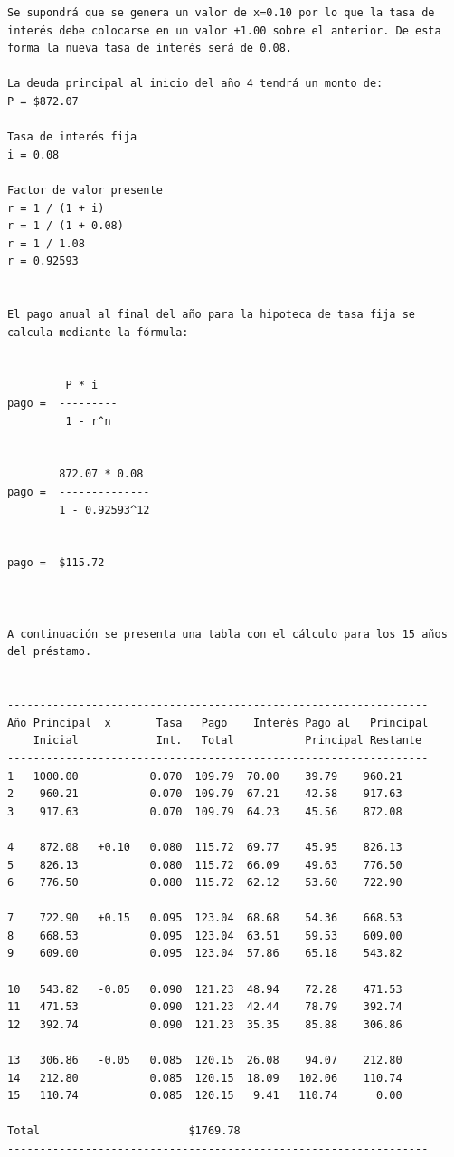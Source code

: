 \begin{verbatim}
Se supondrá que se genera un valor de x=0.10 por lo que la tasa de interés debe colocarse en un valor +1.00 sobre el anterior. De esta forma la nueva tasa de interés será de 0.08.

La deuda principal al inicio del año 4 tendrá un monto de:
P = $872.07

Tasa de interés fija         
i = 0.08

Factor de valor presente
r = 1 / (1 + i)
r = 1 / (1 + 0.08)
r = 1 / 1.08
r = 0.92593


El pago anual al final del año para la hipoteca de tasa fija se calcula mediante la fórmula:


         P * i
pago =  ---------
         1 - r^n


        872.07 * 0.08
pago =  --------------
        1 - 0.92593^12


pago =  $115.72



A continuación se presenta una tabla con el cálculo para los 15 años del préstamo.


-----------------------------------------------------------------
Año Principal  x       Tasa   Pago    Interés Pago al   Principal
    Inicial            Int.   Total           Principal Restante
-----------------------------------------------------------------
1   1000.00           0.070  109.79  70.00    39.79    960.21
2    960.21           0.070  109.79  67.21    42.58    917.63
3    917.63           0.070  109.79  64.23    45.56    872.08

4    872.08   +0.10   0.080  115.72  69.77    45.95    826.13
5    826.13           0.080  115.72  66.09    49.63    776.50
6    776.50           0.080  115.72  62.12    53.60    722.90

7    722.90   +0.15   0.095  123.04  68.68    54.36    668.53
8    668.53           0.095  123.04  63.51    59.53    609.00
9    609.00           0.095  123.04  57.86    65.18    543.82

10   543.82   -0.05   0.090  121.23  48.94    72.28    471.53
11   471.53           0.090  121.23  42.44    78.79    392.74
12   392.74           0.090  121.23  35.35    85.88    306.86

13   306.86   -0.05   0.085  120.15  26.08    94.07    212.80
14   212.80           0.085  120.15  18.09   102.06    110.74
15   110.74           0.085  120.15   9.41   110.74      0.00
-----------------------------------------------------------------
Total                       $1769.78
-----------------------------------------------------------------




\end{verbatim}
